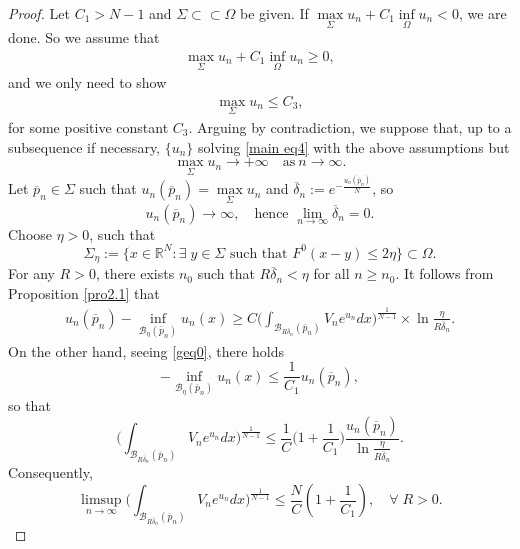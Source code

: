 \documentclass[11pt]{amsart}
\numberwithin{equation}{section}
\newcommand{\R}{\mathbb{R}}
\begin{document}
\begin{proof}
Let $C_1 > N-1$ and $\Sigma \subset\subset \Omega$ be given. If $\max\limits_{\Sigma}u_{n} +C_{1}\inf\limits_{\Omega}u_{n} <0$, we are done. So we assume that
\begin{align}
\label{geq0}
\max_{\Sigma}u_{n} +C_{1}\inf_{\Omega}u_{n} \geq0,
\end{align}
and we only need to show
\begin{align}\label{2.2}
\max_{\Sigma}u_{n} \leq C_{3},
\end{align}
for some positive constant $C_{3}$. Arguing by contradiction, we suppose that, up to a subsequence if necessary, $\{u_{n}\}$ solving \eqref{main eq4} with the above assumptions but
$$\max_{\Sigma}u_{n}\rightarrow + \infty \quad\mbox{as}~ n\rightarrow\infty.$$
Let $\overline{p}_{n}\in \Sigma$ such that $u_{n}(\overline{p}_{n})=\max\limits_{\Sigma}u_{n}$ and  $\overline{\delta}_{n}:=e^{-\frac{u_{n}(\overline{p}_{n})}{N}}$, so
$$u_{n}(\overline{p}_{n})\rightarrow \infty, \quad\mbox{hence } \lim_{n\to \infty} \overline{\delta}_{n} = 0.$$
Choose $\eta>0$, such that
$$\Sigma_{\eta}:=\{x\in\R^N: \exists \; y\in\Sigma \mbox{ such that } F^{0}(x-y)\leq2\eta\}\subset \Omega.$$
For any $R>0$, there exists $n_{0}$ such that $R\overline{\delta}_{n}<\eta$ for all $n \geq n_{0}$. It follows from Proposition \ref{pro2.1} that
\begin{align*}
u_{n}(\overline{p}_{n})-\inf_{\mathcal{B}_{\eta}(\overline{p}_{n})}u_{n}(x)
\geq C\Big(\int_{\mathcal{B}_{R\overline{\delta}_{n}}(\overline{p}_{n})}V_{n}e^{u_{n}}dx\Big)^{\frac{1}{N-1}}\times \ln\frac{\eta}{R\overline{\delta}_{n}}.
\end{align*}
On the other hand, seeing \eqref{geq0}, there holds
$$-\inf_{\mathcal{B}_{\eta}(\overline{p}_{n})}u_{n}(x)\leq\frac{1}{C_{1}}u_{n}(\overline{p}_{n}),$$
so that
$$\Big(\int_{\mathcal{B}_{R\overline{\delta}_{n}}(\overline{p}_{n})}V_{n}e^{u_{n}}dx\Big)^{\frac{1}{N-1}}\leq \frac{1}{C}\Big(1+\frac{1}{C_{1}}\Big)\frac{u_{n}(\overline{p}_{n})}{\ln\frac{\eta}{R\overline{\delta}_{n}}}.$$
Consequently,
$$\limsup_{n\rightarrow\infty}\Big(\int_{\mathcal{B}_{R\overline{\delta}_{n}}(\overline{p}_{n})}V_{n}e^{u_{n}}dx\Big)^{\frac{1}{N-1}}\leq \frac{N}{C}\left(1+\frac{1}{C_{1}}\right), \quad \forall\; R > 0.$$


\end{proof}
\end{document}
